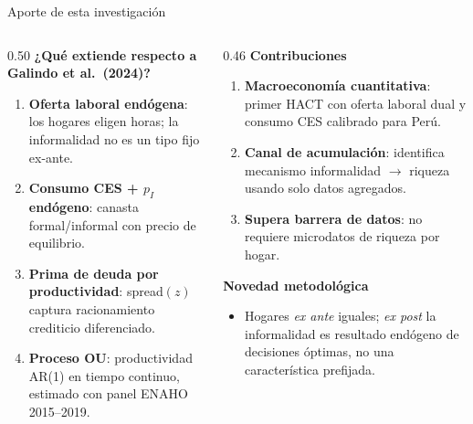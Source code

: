 \documentclass[aspectratio=169,11pt]{beamer}
\begin{document}
\begin{frame}{Aporte de esta investigaci\'on}
  \small
  \begin{columns}[T,onlytextwidth]
    \begin{column}{0.50\textwidth}
      \textbf{¿Qu\'e extiende respecto a Galindo et al.\ (2024)?}
      \begin{enumerate}
        \item \textbf{Oferta laboral end\'ogena}: los hogares eligen horas; la informalidad no es un tipo fijo ex-ante.
        \item \textbf{Consumo CES + $p_I$ end\'ogeno}: canasta formal/informal con precio de equilibrio.
        \item \textbf{Prima de deuda por productividad}: spread$(z)$ captura racionamiento crediticio diferenciado.
        \item \textbf{Proceso OU}: productividad AR(1) en tiempo continuo, estimado con panel ENAHO 2015--2019.
      \end{enumerate}
    \end{column}
    \begin{column}{0.46\textwidth}
      \textbf{Contribuciones}
      \begin{enumerate}
        \item \textbf{Macroeconom\'ia cuantitativa}: primer HACT con oferta laboral dual y consumo CES calibrado para Per\'u.
        \item \textbf{Canal de acumulaci\'on}: identifica mecanismo informalidad $\rightarrow$ riqueza usando solo datos agregados.
        \item \textbf{Supera barrera de datos}: no requiere microdatos de riqueza por hogar.
      \end{enumerate}
      \vspace{0.15cm}
      \textbf{Novedad metodol\'ogica}
      \begin{itemize}
        \item Hogares \textit{ex ante} iguales; \textit{ex post} la informalidad es resultado end\'ogeno de decisiones \'optimas, no una caracter\'istica prefijada.
      \end{itemize}
    \end{column}
  \end{columns}
\end{frame}
\end{document}

